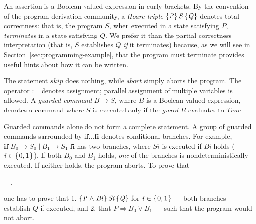 \documentclass[runningheads]{llncs}
\newcommand{\Conid}[1]{\mathit{#1}}
\newcommand{\Varid}[1]{\mathit{#1}}
\def\resethooks{%
  \global\let\SaveRestoreHook\empty
  \global\let\ColumnHook\empty}
\let\hspre\empty
\let\hspost\empty
\let\Varid\mathit
\let\Conid\mathit
\newcounter{linenum}
\begin{document}
An assertion is a Boolean-valued expression in curly brackets.
By the convention of the program derivation community, a \emph{Hoare triple} \ensuremath{\htriple{\Conid{P}}{\Conid{S}}{\Conid{Q}}} denotes total correctness: that is, the program \ensuremath{\Conid{S}}, when executed in a state satisfying \ensuremath{\Conid{P}}, \emph{terminates} in a state satisfying \ensuremath{\Conid{Q}}.
We prefer it than the partial correctness interpretation (that is, \ensuremath{\Conid{S}} establishes \ensuremath{\Conid{Q}} \emph{if} it terminates) because, as we will see in Section~\ref{sec:programming-example}, that the program must terminate provides useful hints about how it can be written.

%

The statement \ensuremath{\Varid{skip}} does nothing, while \ensuremath{\Varid{abort}} simply aborts the program.
The operator \ensuremath{\mathbin{:=}} denotes assignment; parallel assignment of multiple variables is allowed.
A \emph{guarded command} \ensuremath{\Conid{B}\to \Conid{S}}, where \ensuremath{\Conid{B}} is a Boolean-valued expression, denotes a command where \ensuremath{\Conid{S}} is executed only if the \emph{guard} \ensuremath{\Conid{B}} evaluates to \ensuremath{\Conid{True}}.

Guarded commands alone do not form a complete statement.
A group of guarded commands surrounded by \ensuremath{\mathbf{if}\mathbin{...}\mathbf{fi}} denotes conditional branches.
For example, \ensuremath{\mathbf{if}\;\Conid{B}_{0}\to \Conid{S}_{0}\mid \Conid{B}_{1}\to \Conid{S}_{1}\;\mathbf{fi}} has two branches, where \ensuremath{\Conid{Si}} is executed if \ensuremath{\Conid{Bi}} holds (\ensuremath{\Varid{i}\in \{\mskip1.5mu \mathrm{0},\mathrm{1}\mskip1.5mu\}}).
If both \ensuremath{\Conid{B}_{0}} and \ensuremath{\Conid{B}_{1}} holds, \emph{one} of the branches is nondeterministically executed.
If neither holds, the program aborts.
To prove that
\begin{hscode}\linenumsetup\printlinebegin\SaveRestoreHook
\column{B}{@{}>{\hspre}l<{\hspost}@{}}%
\column{E}{@{}>{\hspre}l<{\hspost}@{}}%
\>[B]{}\htriple{\Conid{P}}{\mathbf{if}\;\Conid{B}_{0}\to \Conid{S}_{0}\mid \Conid{B}_{1}\to \Conid{S}_{1}\;\mathbf{fi}}{\Conid{Q}}~~,{}\<[E]%
\printlineend\ColumnHook
\end{hscode}\resethooks
one has to prove that 1. \ensuremath{\htriple{\Conid{P}\mathrel{\wedge}\Conid{Bi}}{\Conid{Si}}{\Conid{Q}}} for \ensuremath{\Varid{i}\in \{\mskip1.5mu \mathrm{0},\mathrm{1}\mskip1.5mu\}} --- both branches establish \ensuremath{\Conid{Q}} if executed, and 2. that \ensuremath{\Conid{P}\mathrel{\Rightarrow}\Conid{B}_{0}\mathrel{\vee}\Conid{B}_{1}} --- such that the program would not abort.
\end{document}
